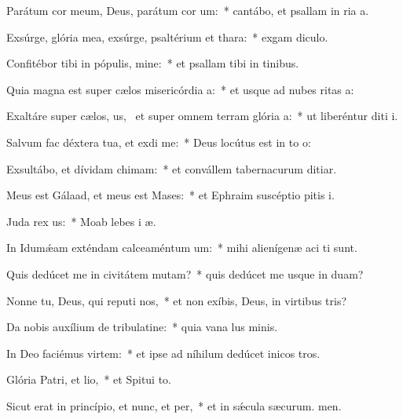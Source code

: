 \item Parátum cor meum, Deus, parátum cor um:~* cantábo, et psallam in ria a.
\item Exsúrge, glória mea, exsúrge, psaltérium et thara:~* exgam diculo.
\item Confitébor tibi in pópulis, mine:~* et psallam tibi in tinibus.
\item Quia magna est super cælos misericórdia a:~* et usque ad nubes ritas a:
\item Exaltáre super cælos, us,~\pscross{} et super omnem terram glória a:~* ut liberéntur diti i.
\item Salvum fac déxtera tua, et exdi me:~* Deus locútus est in to o:
\item Exsultábo, et dívidam chimam:~* et convállem tabernacurum ditiar.
\item Meus est Gálaad, et meus est Mases:~* et Ephraim suscéptio pitis i.
\item Juda rex us:~* Moab lebes i æ.
\item In Idumǽam exténdam calceaméntum um:~* mihi alienígenæ aci ti sunt.
\item Quis dedúcet me in civitátem mutam?~* quis dedúcet me usque in duam?
\item Nonne tu, Deus, qui reputi nos,~* et non exíbis, Deus, in virtibus tris?
\item Da nobis auxílium de tribulatine:~* quia vana lus minis.
\item In Deo faciémus virtem:~* et ipse ad níhilum dedúcet inicos tros.
\item Glória Patri, et lio,~* et Spitui to.
\item Sicut erat in princípio, et nunc, et per,~* et in sǽcula sæcurum. men.
